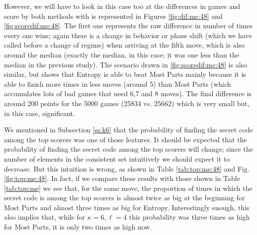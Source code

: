 \documentclass[preprint,12pt]{elsarticle}
\begin{document}
However, we will have to look in this case too at the differences in
games and score by both methods with is represented in Figures
\ref{fig:dif:me:48} and \ref{fig:scoredif:me:48}. The first one
represents the raw difference in number of times every one wins; again
there is a change in behavior or phase shift (which we have called
before a change of regime) when arriving at the fifth move, which is
also around the median (exactly the median, in this case; it was one
less than the median in the previous study). The scenario drawn in
\ref{fig:scoredif:me:48} is also similar, but shows that Entropy is
able to beat Most Parts mainly because it is able to finish more times
in less moves (around 5) than Most Parts (which accumulates lots of
bad games that need 6,7 and 8 moves). The final difference is around
200 points for the 5000 games (25834 vs. 25662) which is very small
but, in this case, significant. 

We mentioned in Subsection \ref{ss:k6} that the probability of finding
the secret code among the top scorers was one of those features. It
should be expected that the probability of finding the secret code 
among the top scorers will change; since the number of elements in the
consistent set intuitively we should expect it to decrease. But this intuition is
wrong, as shown in Table \ref{tab:top:me:48} and Fig. \ref{fig:top:me:48}. 
In fact, if we compare these results with
those shown in Table \ref{tab:top:me} we see that, for the same move,
the proportion of times in which the secret code is among the top
scorers is almost twice as big at the beginning for Most Parts and
almost three times as big for Entropy. Interestingly enough, this also
implies that, while for $\kappa=6, \ell=4$ this probability was three
times as high for Most Parts, it is only two times as high now. 
\end{document}
